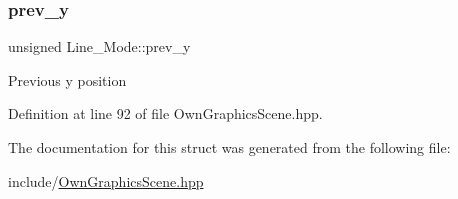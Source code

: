 \subsubsection{\texorpdfstring{prev\+\_\+y}{prev\_y}}
{\footnotesize\ttfamily unsigned Line\+\_\+\+Mode\+::prev\+\_\+y}

Previous y position 

Definition at line 92 of file Own\+Graphics\+Scene.\+hpp.



The documentation for this struct was generated from the following file\+:\begin{DoxyCompactItemize}
\item 
include/\mbox{\hyperlink{OwnGraphicsScene_8hpp}{Own\+Graphics\+Scene.\+hpp}}\end{DoxyCompactItemize}
